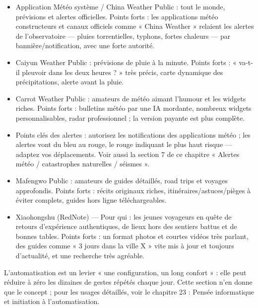 \begin{itemize}
  \item Application Météo système / China Weather Public : tout le monde, prévisions et alertes officielles. Points forts : les applications météo constructeurs et canaux officiels comme « China Weather » relaient les alertes de l'observatoire — pluies torrentielles, typhons, fortes chaleurs — par bannière/notification, avec une forte autorité.
  \item Caiyun Weather Public : prévisions de pluie à la minute. Points forts : « va-t-il pleuvoir dans les deux heures ? » très précis, carte dynamique des précipitations, alerte avant la pluie.
  \item Carrot Weather Public : amateurs de météo aimant l'humour et les widgets riches. Points forts : bulletins météo par une IA mordante, nombreux widgets personnalisables, radar professionnel ; la version payante est plus complète.
  \item Points clés des alertes : autorisez les notifications des applications météo ; les alertes vont du bleu au rouge, le rouge indiquant le plus haut risque — adaptez vos déplacements. Voir aussi la section 7 de ce chapitre « Alertes météo / catastrophes naturelles / séismes ».
\end{itemize}


\begin{itemize}
  \item Mafengwo Public : amateurs de guides détaillés, road trips et voyages approfondis. Points forts : récits originaux riches, itinéraires/astuces/pièges à éviter complets, guides hors ligne téléchargeables.
  \item Xiaohongshu (RedNote) — Pour qui : les jeunes voyageurs en quête de retours d'expérience authentiques, de lieux hors des sentiers battus et de bonnes tables. Points forts : un format photos et courtes vidéos très parlant, des guides comme « 3 jours dans la ville X » vite mis à jour et toujours d'actualité, et une recherche très agréable.
\end{itemize}


L'automatisation est un levier « une configuration, un long confort » : elle peut réduire à zéro les dizaines de gestes répétés chaque jour. Cette section n'en donne que le concept ; pour les usages détaillés, voir le chapitre 23 : Pensée informatique et initiation à l'automatisation.

